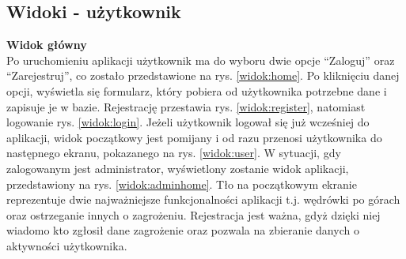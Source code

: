 \subsection{Widoki - użytkownik}
\textbf{Widok główny}\\
Po uruchomieniu aplikacji użytkownik ma do wyboru dwie opcje “Zaloguj” oraz “Zarejestruj”, co zostało przedstawione na rys. \ref{widok:home}. Po kliknięciu danej opcji, wyświetla się formularz, który pobiera od użytkownika potrzebne dane i zapisuje je w bazie. Rejestrację przestawia rys. \ref{widok:register}, natomiast logowanie rys. \ref{widok:login}. Jeżeli użytkownik logował się już wcześniej do aplikacji, widok początkowy jest pomijany i od razu przenosi użytkownika do następnego ekranu, pokazanego na rys. \ref{widok:user}. W sytuacji, gdy zalogowanym jest administrator, wyświetlony zostanie widok aplikacji, przedstawiony na rys. \ref{widok:adminhome}. Tło na początkowym ekranie reprezentuje dwie najważniejsze funkcjonalności aplikacji t.j. wędrówki po górach oraz ostrzeganie innych o zagrożeniu. Rejestracja jest ważna, gdyż dzięki niej wiadomo kto zgłosił dane zagrożenie oraz pozwala na zbieranie danych o aktywności użytkownika.\\

